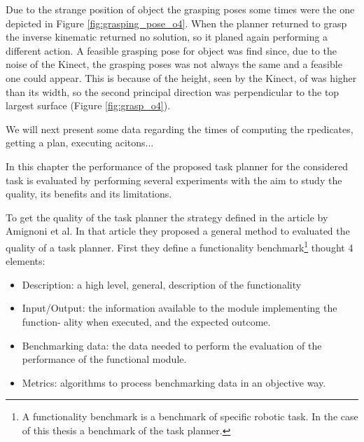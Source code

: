 Due to the strange position of object  the grasping poses some times were the one depicted in Figure \ref{fig:grasping_pose_o4}. When the planner returned to grasp  the inverse kinematic returned no solution, so it planed again performing a different action. A feasible grasping pose for object  was find since, due to the noise of the Kinect, the grasping poses was not always the same and a feasible one could appear. This is because of the height, seen by the Kinect, of  was higher than its width, so the second principal direction was perpendicular to the top largest surface (Figure \ref{fig:grasp_o4}). 


We will next present some data regarding the times of computing the rpedicates, getting a plan, executing acitons...







\iffalse
In this chapter the performance of the proposed task planner for the considered task is evaluated by performing several experiments with the aim to study the quality, its benefits and its limitations.

To get the quality of the task planner the strategy defined in the article \citep{Benchmarking} by Amignoni et al. In that article they proposed a general method to evaluated the quality of a task planner. 
First they define a functionality benchmark\footnote{A functionality benchmark is a benchmark of specific robotic task. In the case of this thesis a benchmark of the task planner.} thought 4 elements:
\begin{itemize}
\item Description: a high level, general, description of the functionality
\item Input/Output: the information available to the module implementing the function-
ality when executed, and the expected outcome.
\item Benchmarking data: the data needed to perform the evaluation of the performance
of the functional module.
\item Metrics: algorithms to process benchmarking data in an objective way.
\end{itemize}

